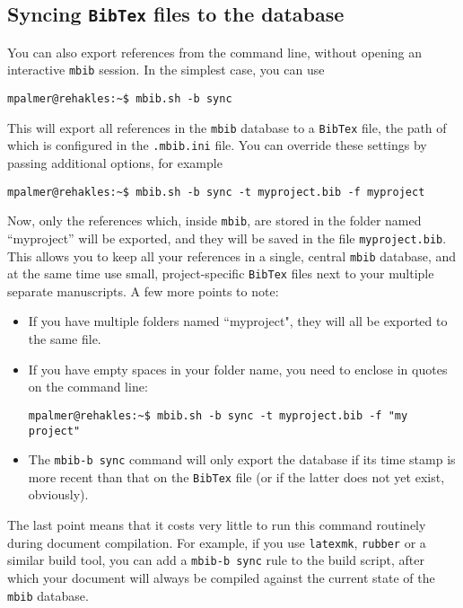 \documentclass[10pt]{article}
\newcommand*{\mbib}{\texttt{mbib}\xspace}
\newcommand*{\bibtex}{\texttt{BibTex}\xspace}
\newcommand*{\ini}{\texttt{.mbib.ini}\xspace}
\begin{document}
\subsection{Syncing \bibtex files to the database}

You can also export references from the command line, without opening an interactive \mbib session. In the simplest case, you can use 

\begin{verbatim}
mpalmer@rehakles:~$ mbib.sh -b sync
\end{verbatim}

\noindent This will export all references in the \mbib database to a \bibtex file, the path of which is configured in the \ini file. You can override these settings by passing additional options, for example 

\begin{verbatim}
mpalmer@rehakles:~$ mbib.sh -b sync -t myproject.bib -f myproject
\end{verbatim}

\noindent Now, only the references which, inside \mbib, are stored in the folder named ``myproject'' will be exported, and they will be saved in the file \texttt{myproject.bib}. This allows you to keep all your references in a single, central \mbib database, and at the same time use small, project-specific \bibtex files next to your multiple separate manuscripts. A few more points to note: 

\begin{itemize}
\item If you have multiple folders named ``myproject", they will all be exported to the same file. 

\item If you have empty spaces in your folder name, you need to enclose in quotes on the command line:

\begin{verbatim}
mpalmer@rehakles:~$ mbib.sh -b sync -t myproject.bib -f "my project"
\end{verbatim}

\item The \texttt{\mbib -b sync} command will only export the database if its time stamp is more recent than that on the \bibtex file (or if the latter does not yet exist, obviously). 

\end{itemize}

\noindent The last point means that it costs very little to run this command routinely during document compilation. For example, if you use \texttt{latexmk}, \texttt{rubber} or a similar build tool, you can add a \texttt{\mbib -b sync} rule to the build script, after which your document will always be compiled against the current state of the \mbib database.
\end{document}
